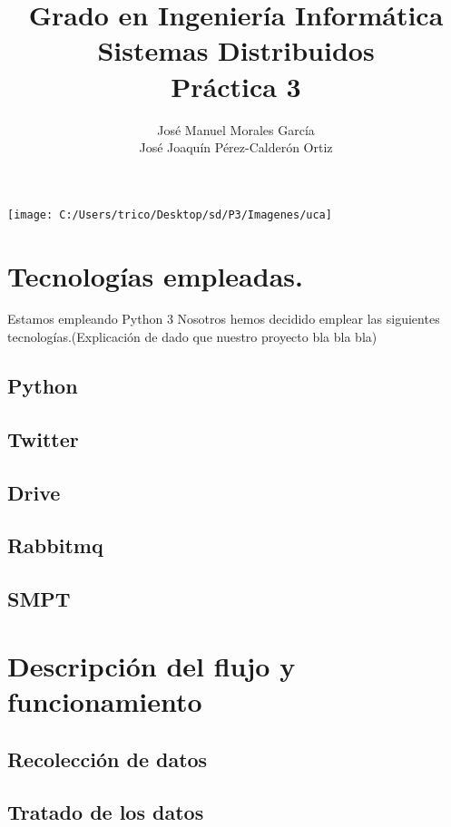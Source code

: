 \documentclass[12pt,letterpaper]{article}
\title{Grado en Ingeniería Informática\\Sistemas Distribuidos\\Práctica 3}
\author{José Manuel Morales García \\ José Joaquín Pérez-Calderón Ortiz}
\begin{document}
	\maketitle
	\begin{center}
		\texttt{[image: C:/Users/trico/Desktop/sd/P3/Imagenes/uca]}
	\end{center}
	
	\thispagestyle{empty}
	\newpage
	\tableofcontents
	\newpage
	
	
	
	
	\lstset{language=bash, numbers=left, numberstyle=\tiny, numbersep=10pt, firstnumber=1, stepnumber=1}
		\section{Tecnologías empleadas.}
			Estamos empleando Python 3
			Nosotros hemos decidido emplear las siguientes tecnologías.(Explicación de dado que nuestro proyecto bla bla bla)
			\subsection{Python}
			\subsection{Twitter}
			\subsection{Drive}
			\subsection{Rabbitmq }
			\subsection{SMPT}
		\newpage	
		\section{Descripción del flujo y funcionamiento}
			\subsection{Recolección de datos}
			\subsection{Tratado de los datos}
\end{document}
